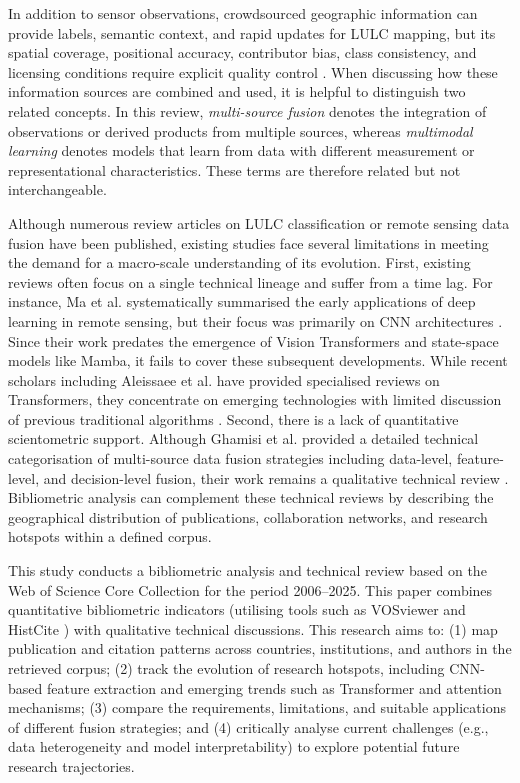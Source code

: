\documentclass[]{interact}
\theoremstyle{plain}%
\theoremstyle{definition}
\theoremstyle{remark}
\begin{document}
In addition to sensor observations, crowdsourced geographic information can provide labels, semantic context, and rapid updates for LULC mapping, but its spatial coverage, positional accuracy, contributor bias, class consistency, and licensing conditions require explicit quality control \citep{wu2024crowdsourced}. When discussing how these information sources are combined and used, it is helpful to distinguish two related concepts. In this review, \emph{multi-source fusion} denotes the integration of observations or derived products from multiple sources, whereas \emph{multimodal learning} denotes models that learn from data with different measurement or representational characteristics. These terms are therefore related but not interchangeable.

Although numerous review articles on LULC classification or remote sensing data fusion have been published, existing studies face several limitations in meeting the demand for a macro-scale understanding of its evolution. First, existing reviews often focus on a single technical lineage and suffer from a time lag. For instance, Ma et al. systematically summarised the early applications of deep learning in remote sensing, but their focus was primarily on CNN architectures \citep{56}. Since their work predates the emergence of Vision Transformers and state-space models like Mamba, it fails to cover these subsequent developments. While recent scholars including Aleissaee et al. have provided specialised reviews on Transformers, they concentrate on emerging technologies with limited discussion of previous traditional algorithms \citep{7}. Second, there is a lack of quantitative scientometric support. Although Ghamisi et al. provided a detailed technical categorisation of multi-source data fusion strategies including data-level, feature-level, and decision-level fusion, their work remains a qualitative technical review \citep{6}. Bibliometric analysis can complement these technical reviews by describing the geographical distribution of publications, collaboration networks, and research hotspots within a defined corpus.


This study conducts a bibliometric analysis and technical review based on the Web of Science Core Collection for the period 2006--2025. This paper combines quantitative bibliometric indicators (utilising tools such as VOSviewer and HistCite \citep{9,10}) with qualitative technical discussions. This research aims to: (1) map publication and citation patterns across countries, institutions, and authors in the retrieved corpus; (2) track the evolution of research hotspots, including CNN-based feature extraction and emerging trends such as Transformer and attention mechanisms; (3) compare the requirements, limitations, and suitable applications of different fusion strategies; and (4) critically analyse current challenges (e.g., data heterogeneity and model interpretability) to explore potential future research trajectories.
\end{document}

